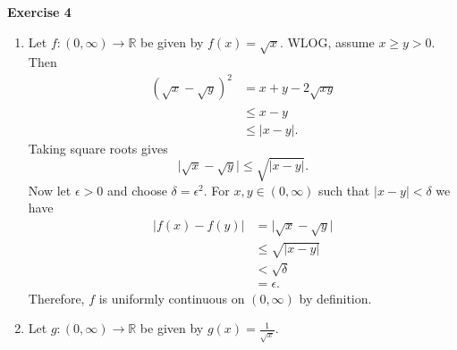 \documentclass[12pt]{article}
\begin{document}
\textbf{Exercise 4}
\begin{enumerate}[label=(\alph*)]
    \item Let \( f: (0, \infty ) \to  \mathbb{R} \) be given by \( f(x) = \sqrt{x} \). WLOG, assume \( x \geq y > 0 \). Then
          \[
              \begin{split}
                  (\sqrt{x} - \sqrt{y})^2 & = x + y - 2\sqrt{xy}    \\
                                          & \leq x - y              \\
                                          & \leq \vert x - y \vert.
              \end{split}
          \]
          Taking square roots gives
          \[
              \vert \sqrt{x} - \sqrt{y} \vert \leq  \sqrt{\vert x - y \vert }.
          \]
          Now let \( \epsilon > 0 \) and choose \( \delta = \epsilon^2  \). For \( x,y \in (0, \infty) \) such that \( \vert x - y \vert < \delta  \) we have
          \[
              \begin{split}
                  \vert f(x) - f(y) \vert & = \vert \sqrt{x} - \sqrt{y} \vert \\
                                          & \leq \sqrt{\vert x - y \vert }    \\
                                          & < \sqrt{\delta}                   \\
                                          & = \epsilon.
              \end{split}
          \]
          Therefore, \( f \) is uniformly continuous on \( (0, \infty ) \) by definition.

    \item Let \( g: (0, \infty ) \to \mathbb{R} \) be given by \( g(x) = \frac{1}{\sqrt{x}} \).


\end{enumerate}
\end{document}
